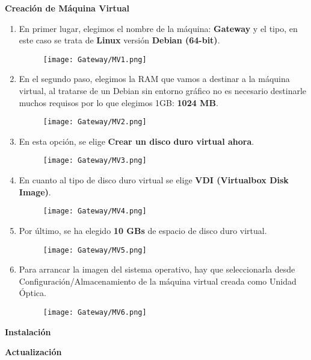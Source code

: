 \textbf{Creación de Máquina Virtual}
\begin{enumerate}

\item En primer lugar, elegimos el nombre de la máquina: \textbf{Gateway} y el tipo, en este caso se trata de \textbf{Linux} versión \textbf{Debian (64-bit)}.
\begin{figure}[H] %
\begin{center}
\texttt{[image: Gateway/MV1.png]}
\end{center}
\end{figure}

\item En el segundo paso, elegimos la RAM que vamos a destinar a la máquina virtual, al tratarse de un Debian sin entorno gráfico no es necesario destinarle muchos requisos por lo que elegimos 1GB: \textbf{1024 MB}.
\begin{figure}[H] %
\begin{center}
\texttt{[image: Gateway/MV2.png]}
\end{center}
\end{figure}

\item En esta opción, se elige \textbf{Crear un disco duro virtual ahora}.
\begin{figure}[H] %
\begin{center}
\texttt{[image: Gateway/MV3.png]}
\end{center}
\end{figure}

\item En cuanto al tipo de disco duro virtual se elige \textbf{VDI (Virtualbox Disk Image)}.
\begin{figure}[H] %
\begin{center}
\texttt{[image: Gateway/MV4.png]}
\end{center}
\end{figure}

\item Por último, se ha elegido \textbf{10 GBs} de espacio de disco duro virtual.
\begin{figure}[H] %
\begin{center}
\texttt{[image: Gateway/MV5.png]}
\end{center}
\end{figure}

\item Para arrancar la imagen del sistema operativo, hay que seleccionarla desde Con\-fi\-gu\-ra\-ción/\-Almacenamiento de la máquina virtual creada como Unidad Óptica.
\begin{figure}[H] %
\begin{center}
\texttt{[image: Gateway/MV6.png]}
\end{center}
\end{figure}




\end{enumerate}
\textbf{Instalación}

\textbf{Actualización}
